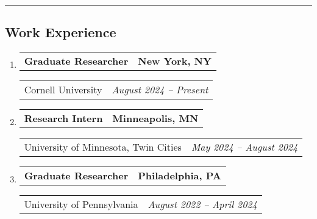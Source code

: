 \documentclass[letterpaper]{article}
\makeatletter
\newif\iflong
\newcommand*{\tabulardef}[3]{\begin{tabular}[t]{@{}lp{\dimexpr\linewidth-#1}@{}}
    #2&#3
\end{tabular}}
\newcommand{\headerrow}[2]
{\begin{tabular*}{\linewidth}{l@{\extracolsep{\fill}}r}
	#1 &
	#2 \\
\end{tabular*}}
\makeatother
\begin{document}
\hrule
\subsection*{Work Experience}

\begin{enumerate}[label=]
	\parskip=-0.05em

	\item
		\headerrow
			{\textbf{Graduate Researcher}}
			{\textbf{New York, NY}}
	\headerrow
        {Cornell University}
        {\emph{August 2024 -- Present}}
    \iflong
	\begin{enumerate}[label= *]
	\parskip=-0.1em
        \item\tabulardef{4cm}{}{Working on program logics for reasoning about concurrent,
            randomized programs}
        \item\tabulardef{4cm}{}{Developed a programming language for verifying quantitative
            network properties (e.g. latency, bandwidth)}
	\end{enumerate}
    \fi

	\item
		\headerrow
			{\textbf{Research Intern}}
			{\textbf{Minneapolis, MN}}
	\headerrow
		{University of Minnesota, Twin Cities}
        {\emph{May 2024 -- August 2024}}
    \iflong
	\begin{enumerate}[label= *]
	\parskip=-0.1em
        \item\tabulardef{4cm}{}{Developed an extension to Martin-L\"{o}f type theory with strictly
            associative dependent sums and presented work at HoTT MURI 2024 Meeting}
	\end{enumerate}
    \fi

	\item
		\headerrow
			{\textbf{Graduate Researcher}}
			{\textbf{Philadelphia, PA}}
	\headerrow
        {University of Pennsylvania}
        {\emph{August 2022 -- April 2024}}
    \iflong
	\begin{enumerate}[label= *]
	\parskip=-0.1em
        \item\tabulardef{4cm}{}{
            Developed type system for tracking effects and coeffects in
            call-by-push-value (with properties formalized in Rocq)
            and presented paper at OOPSLA 2024}
    \item\tabulardef{4cm}{}{Wrote paper in literate Agda
            (available on the arXiv) showcasing a proof
            that can be used for teaching the technique
            of logical relations with a proof assistant}
	\end{enumerate}
    \fi


\end{enumerate}
\end{document}
